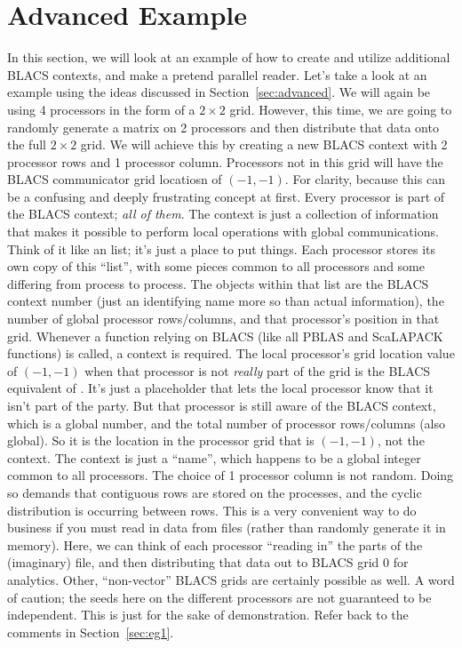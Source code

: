 \section[]{Advanced Example}\label{sec:eg2}

In this section, we will look at an example of how to create and utilize additional BLACS contexts, and make a pretend parallel reader.
\np
Let's take a look at an example using the ideas discussed in Section~\ref{sec:advanced}.  We will again be using 4 processors in the form of a $2\times 2$ grid.  However, this time, we are going to randomly generate a matrix on 2 processors and then distribute that data onto the full $2\times 2$ grid.  We will achieve this by creating a new BLACS context with 2 processor rows and 1 processor column.  Processors not in this grid will have the BLACS communicator grid locatiosn of $(-1, -1)$. 
\np
For clarity, because this can be a confusing and deeply frustrating concept at first.  Every processor is part of the BLACS context; \emph{all of them}.  The context is just a collection of information that makes it possible to perform local operations with global communications.  Think of it like an  list; it's just a place to put things.  Each processor stores its own copy of this ``list'', with some pieces common to all processors and some differing from process to process.  The objects within that list are the BLACS context number (just an identifying name more so than actual information), the number of global processor rows/columns, and that processor's position in that grid.  Whenever a function relying on BLACS (like all PBLAS and ScaLAPACK functions) is called, a context is required.  The local processor's grid location value of $(-1, -1)$ when that processor is not \emph{really} part of the grid is the BLACS equivalent of .  It's just a placeholder that lets the local 
processor know that it isn't part of the party.  But that processor is still aware of the BLACS context, which is a global number, and the total number of processor rows/columns (also global).  So it is the location in the processor grid that is $(-1, -1)$, not the context.  The context is just a ``name'', which happens to be a global integer common to all processors.
\np
The choice of 1 processor column is not random.  Doing so demands that contiguous rows are stored on the processes, and the cyclic distribution is occurring between rows.  This is a very convenient way to do business if you must read in data from files (rather than randomly generate it in memory).  Here, we can think of each processor ``reading in'' the parts of the (imaginary) file, and then distributing that data out to BLACS grid 0 for analytics.  Other, ``non-vector'' BLACS grids are certainly possible as well.
\np
A word of caution; the seeds here on the different processors are not guaranteed to be independent.  This is just for the sake of demonstration.  Refer back to the comments in Section~\ref{sec:eg1}.

